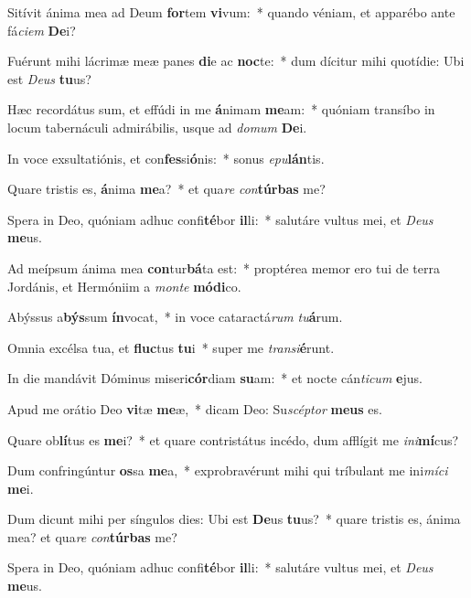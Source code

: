\item Sitívit ánima mea ad Deum \textbf{for}tem \textbf{vi}vum:~* quando véniam, et apparébo ante fá\textit{ci}\textit{em} \textbf{De}i?
\item Fuérunt mihi lácrimæ meæ panes \textbf{di}e ac \textbf{noc}te:~* dum dícitur mihi quotídie: Ubi est \textit{De}\textit{us} \textbf{tu}us?
\item Hæc recordátus sum, et effúdi in me \textbf{á}nimam \textbf{me}am:~* quóniam transíbo in locum tabernáculi admirábilis, usque ad \textit{do}\textit{mum} \textbf{De}i.
\item In voce exsultatiónis, et con\textbf{fes}si\textbf{ó}nis:~* sonus \textit{e}\textit{pu}\textbf{lán}tis.
\item Quare tristis es, \textbf{á}nima \textbf{me}a?~* et qua\textit{re} \textit{con}\textbf{túr}\textbf{bas} me?
\item Spera in Deo, quóniam adhuc confi\textbf{té}bor \textbf{il}li:~* salutáre vultus mei, et \textit{De}\textit{us} \textbf{me}us.
\item Ad meípsum ánima mea \textbf{con}tur\textbf{bá}ta est:~* proptérea memor ero tui de terra Jordánis, et Hermóniim a \textit{mon}\textit{te} \textbf{mó}\textbf{di}co.
\item Abýssus a\textbf{býs}sum \textbf{ín}vocat,~* in voce cataractá\textit{rum} \textit{tu}\textbf{á}rum.
\item Omnia excélsa tua, et \textbf{fluc}tus \textbf{tu}i~* super me \textit{trans}\textit{i}\textbf{é}runt.
\item In die mandávit Dóminus miseri\textbf{cór}diam \textbf{su}am:~* et nocte cán\textit{ti}\textit{cum} \textbf{e}jus.
\item Apud me orátio Deo \textbf{vi}tæ \textbf{me}æ,~* dicam Deo: Su\textit{scép}\textit{tor} \textbf{me}\textbf{us} es.
\item Quare ob\textbf{lí}tus es \textbf{me}i?~* et quare contristátus incédo, dum afflígit me \textit{in}\textit{i}\textbf{mí}cus?
\item Dum confringúntur \textbf{os}sa \textbf{me}a,~* exprobravérunt mihi qui tríbulant me ini\textit{mí}\textit{ci} \textbf{me}i.
\item Dum dicunt mihi per síngulos dies: Ubi est \textbf{De}us \textbf{tu}us?~* quare tristis es, ánima mea? et qua\textit{re} \textit{con}\textbf{túr}\textbf{bas} me?
\item Spera in Deo, quóniam adhuc confi\textbf{té}bor \textbf{il}li:~* salutáre vultus mei, et \textit{De}\textit{us} \textbf{me}us.
